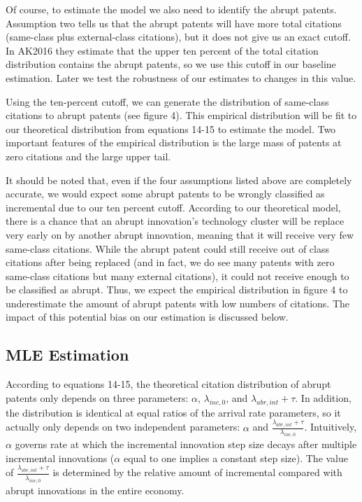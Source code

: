 \documentclass[letterpaper,12pt]{article}
\theoremstyle{definition}
\begin{document}
Of course, to estimate the model we also need to identify the abrupt patents. Assumption two tells us that the abrupt patents will have more total citations (same-class plus external-class citations), but it does not give us an exact cutoff. In AK2016 they estimate that the upper ten percent of the total citation distribution contains the abrupt patents, so we use this cutoff in our baseline estimation. Later we test the robustness of our estimates to changes in this value.

Using the ten-percent cutoff, we can generate the distribution of same-class citations to abrupt patents (see figure 4). This empirical distribution will be fit to our theoretical distribution from equations 14-15 to estimate the model. Two important features of the empirical distribution is the large mass of patents at zero citations and the large upper tail.

It should be noted that, even if the four assumptions listed above are completely accurate, we would expect some abrupt patents to be wrongly classified as incremental due to our ten percent cutoff. According to our theoretical model, there is a chance that an abrupt innovation’s technology cluster will be replace very early on by another abrupt innovation, meaning that it will receive very few same-class citations. While the abrupt patent could still receive out of class citations after being replaced (and in fact, we do see many patents with zero same-class citations but many external citations), it could not receive enough to be classified as abrupt. Thus, we expect the empirical distribution in figure 4 to underestimate the amount of abrupt patents with low numbers of citations. The impact of this potential bias on our estimation is discussed below.

\subsection{MLE Estimation}

According to equations 14-15, the theoretical citation distribution of abrupt patents only depends on three parameters: $\alpha$, $\lambda_{inc,0}$, and $\lambda_{abr, int} + \tau$. In addition, the distribution is identical at equal ratios of the arrival rate parameters, so it actually only depends on two independent parameters: $\alpha$ and $\frac{\lambda_{abr, int} + \tau}{\lambda_{inc,0}}$. Intuitively, $\alpha$ governs rate at which the incremental innovation step size decays after multiple incremental innovations ($\alpha$ equal to one implies a constant step size). The value of  $\frac{\lambda_{abr, int} + \tau}{\lambda_{inc,0}}$ is determined by the relative amount of incremental compared with abrupt innovations in the entire economy.
\end{document}
